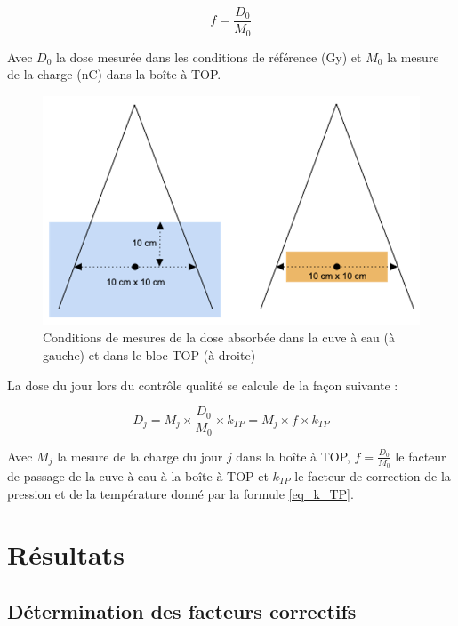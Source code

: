 \documentclass{article}
\begin{document}
\begin{equation}
  f = \dfrac{D_0}{M_0}
  \label{eq_facteur_top}
\end{equation}

Avec $D_0$ la dose mesurée dans les conditions de référence (Gy) et $M_0$ la mesure de la charge (nC) dans la boîte à TOP.

\begin{figure}[h]
  \centering
  \includegraphics[scale=0.8]{figures/conditions_ref_top.png}
  \caption{Conditions de mesures de la dose absorbée dans la cuve à eau (à gauche) et dans le bloc TOP (à droite)}
  \label{fig_top}
\end{figure}

La dose du jour lors du contrôle qualité se calcule de la façon suivante :

\begin{equation}
  D_j = M_j \times \dfrac{D_0}{M_0} \times k_{TP} = M_j \times f \times k_{TP}
  \label{eq_top_jour}
\end{equation}

Avec $M_j$ la mesure de la charge du jour $j$ dans la boîte à TOP, $f = \frac{D_0}{M_0}$ le facteur de passage de la cuve à eau à la boîte à TOP et $k_{TP}$ le facteur de correction de la pression et de la température donné par la formule \ref*{eq_k_TP}.

\newpage
\section{Résultats}
\subsection{Détermination des facteurs correctifs}
\end{document}

